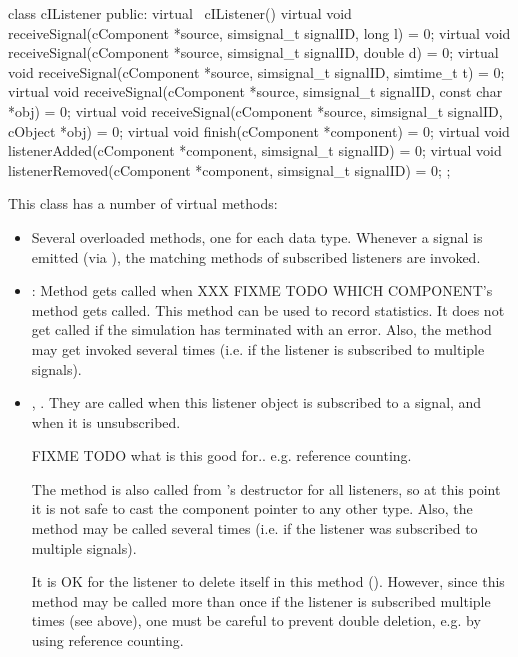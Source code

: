 \begin{note}
\begin{note}
\begin{cpp}
class cIListener
{
  public:
    virtual ~cIListener() {}
    virtual void receiveSignal(cComponent *source, simsignal_t signalID, long l) = 0;
    virtual void receiveSignal(cComponent *source, simsignal_t signalID, double d) = 0;
    virtual void receiveSignal(cComponent *source, simsignal_t signalID, simtime_t t) = 0;
    virtual void receiveSignal(cComponent *source, simsignal_t signalID, const char *obj) = 0;
    virtual void receiveSignal(cComponent *source, simsignal_t signalID, cObject *obj) = 0;
    virtual void finish(cComponent *component) = 0;
    virtual void listenerAdded(cComponent *component, simsignal_t signalID) = 0;
    virtual void listenerRemoved(cComponent *component, simsignal_t signalID) = 0;
};
\end{cpp}

This class has a number of virtual methods:

\begin{itemize}
  \item Several overloaded  methods, one for each
    data type. Whenever a signal is emitted (via ),
    the matching  methods of subscribed listeners
    are invoked.
  \item {}: Method gets called when XXX FIXME TODO WHICH COMPONENT's
     method gets called. This method can be used to record
    statistics. It does not get called if the simulation has terminated
    with an error. Also, the method may get invoked several times (i.e.
    if the listener is subscribed to multiple signals).
  \item {}, . They are called
    when this listener object is subscribed to a signal, and when it is
    unsubscribed.

    FIXME TODO what is this good for.. e.g. reference counting.

    The  method is also called from 's
    destructor for all listeners, so at this point it is not safe to cast the
    component pointer to any other type. Also, the method may be called several times
    (i.e. if the listener was subscribed to multiple signals).

    It is OK for the listener to delete itself in this method ().
    However, since this method may be called more than once if the listener
    is subscribed multiple times (see above), one must be careful to prevent
    double deletion, e.g. by using reference counting.


\end{itemize}
\end{note}
\end{note}
